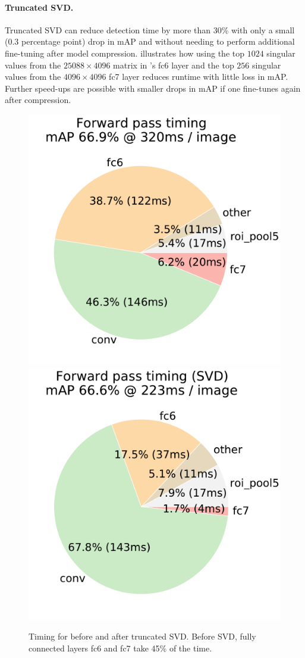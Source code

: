 \paragraph{Truncated SVD.}
Truncated SVD can reduce detection time by more than 30\% with only a small (0.3 percentage point) drop in mAP and without needing to perform additional fine-tuning after model compression.
 illustrates how using the top $1024$ singular values from the $25088 \times 4096$ matrix in {\vggsixteen}'s fc6 layer and the top $256$ singular values from the $4096 \times 4096$ fc7 layer reduces runtime with little loss in mAP.
Further speed-ups are possible with smaller drops in mAP if one fine-tunes again after compression.

\begin{figure}[h!]
\centering
\includegraphics[width=0.49\linewidth,trim=3em 2em 0 0, clip]{figs/layer_timing.pdf}
\includegraphics[width=0.49\linewidth,trim=3em 2em 0 0, clip]{figs/layer_timing_svd.pdf}
\caption{Timing for \vggsixteen before and after truncated SVD.
Before SVD, fully connected layers fc6 and fc7 take 45\% of the time.}
\end{figure}

